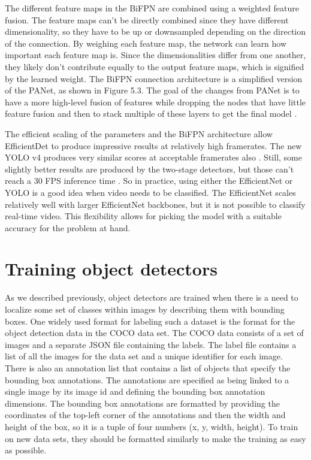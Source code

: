 The different feature maps in the BiFPN are combined using a weighted feature fusion.
The feature maps can't be directly combined since they have different dimensionality, so they have to be up or downsampled depending on the direction of the connection.
By weighing each feature map, the network can learn how important each feature map is.
Since the dimensionalities differ from one another, they likely don't contribute equally to the output feature maps, which is signified by the learned weight.
The BiFPN connection architecture is a simplified version of the PANet, as shown in Figure 5.3.
The goal of the changes from PANet is to have a more high-level fusion of features while dropping the nodes that have little feature fusion and then to stack multiple of these layers to get the final model \citep{efficientDet}.

The efficient scaling of the parameters and the BiFPN architecture allow EfficientDet to produce impressive results at relatively high framerates.
The new YOLO v4 produces very similar scores at acceptable framerates also \citep{yolov4}.
Still, some slightly better results are produced by the two-stage detectors, but those can't reach a 30 FPS inference time \citep{yolov4}.
So in practice, using either the EfficientNet or YOLO is a good idea when video needs to be classified.
The EfficientNet scales relatively well with larger EfficientNet backbones, but it is not possible to classify real-time video.
This flexibility allows for picking the model with a suitable accuracy for the problem at hand.

\section{Training object detectors}
As we described previously, object detectors are trained when there is a need to localize some set of classes within images by describing them with bounding boxes.
One widely used format for labeling such a dataset is the format for the object detection data in the COCO data set.
The COCO data consists of a set of images and a separate JSON file containing the labels.
The label file contains a list of all the images for the data set and a unique identifier for each image.
There is also an annotation list that contains a list of objects that specify the bounding box annotations.
The annotations are specified as being linked to a single image by its image id and defining the bounding box annotation dimensions.
The bounding box annotations are formatted by providing the coordinates of the top-left corner of the annotations and then the width and height of the box, so it is a tuple of four numbers (x, y, width, height).
To train on new data sets, they should be formatted similarly to make the training as easy as possible.

